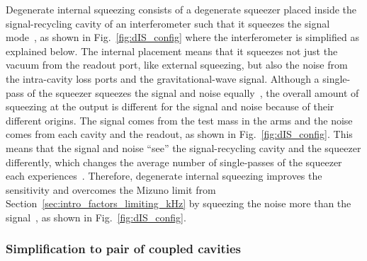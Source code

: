 Degenerate internal squeezing consists of a degenerate squeezer placed inside the signal-recycling cavity of an interferometer such that it squeezes the signal mode~\cite{}, as shown in Fig.~\ref{fig:dIS_config} where the interferometer is simplified as explained below. The internal placement means that it squeezes not just the vacuum from the readout port, like external squeezing, but also the noise from the intra-cavity loss ports and the gravitational-wave signal. Although a single-pass of the squeezer squeezes the signal and noise equally~\cite{}, the overall amount of squeezing at the output is different for the signal and noise because of their different origins. The signal comes from the test mass in the arms and the noise comes from each cavity and the readout, as shown in Fig.~\ref{fig:dIS_config}. This means that the signal and noise ``see'' the signal-recycling cavity and the squeezer differently, which changes the average number of single-passes of the squeezer each experiences~\cite{}. 
Therefore, degenerate internal squeezing improves the sensitivity and overcomes the Mizuno limit from Section~\ref{sec:intro_factors_limiting_kHz} by squeezing the noise more than the signal~\cite{}, as shown in Fig.~\ref{fig:dIS_config}.

\subsubsection{Simplification to pair of coupled cavities}
\label{sec:coupled_cavity_approximation}


